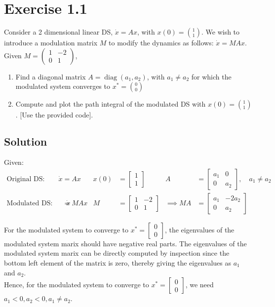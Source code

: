 \section*{Exercise 1.1}

Consider a 2 dimensional linear DS, \( \dot{x}=A x \), with \( x(0)=\binom{1}{1} \).
We wish to introduce a modulation matrix \( M \) to modify the dynamics as follows: \( \dot{x}=M A x \).
Given \( M=\left(\begin{array}{cc}1 & -2 \\ 0 & 1\end{array}\right) \),
\begin{enumerate}[noitemsep]
    \item Find a diagonal matrix \( A=\operatorname{diag}\left(a_{1}, a_{2}\right) \), with \( a_{1} \neq a_{2} \) for which the modulated system converges to \( x^{*}=\binom{0}{0} \)
    \item Compute and plot the path integral of the modulated DS with \( x(0)=\binom{1}{1} \). [Use the provided code].
\end{enumerate}

\subsection*{Solution}

Given:
\begin{align*}
    \text{Original DS:}
    \qquad
    \dot{x}
      & = A x
      &
    x(0)
      & =
    \begin{bmatrix} 1 \\ 1 \end{bmatrix}
      &
    A
      & =
    \begin{bmatrix} a_1 & 0 \\ 0 & a_2 \end{bmatrix},
    \quad a_1 \neq a_2
    \\
    \text{Modulated DS:}
    \qquad
    \dot{x}
      & =
    M A x
      &
    M & =
    \begin{bmatrix} 1 & -2 \\ 0 & 1 \end{bmatrix}
      &
    \implies
    M A
      & =
    \begin{bmatrix} a_1 & -2 a_2 \\ 0 & a_2 \end{bmatrix}
\end{align*}

For the modulated system to converge to \( x^{*}=\begin{bmatrix} 0 \\ 0 \end{bmatrix} \), the eigenvalues of the modulated system marix should have negative real parts.
The eigenvalues of the modulated system marix can be directly computed by inspection since the bottom left element of the matrix is zero, thereby giving the eigenvalues as \( a_1 \) and \( a_2 \).
\\
Hence, for the modulated system to converge to \( x^{*}=\begin{bmatrix} 0 \\ 0 \end{bmatrix} \), we need \( \boxed{a_1 < 0, a_2 < 0, a_1 \neq a_2} \).
